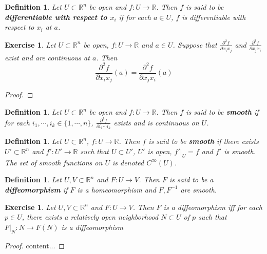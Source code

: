 \documentclass[12pt]{amsart}
\newtheorem{defn}[thm]{Definition}
\newtheorem{ex}[thm]{Exercise}
\newcommand{\R}{\mathbb{R}}
\begin{document}
	\begin{defn}
		Let $U \subset \R^n$ be open and $f: U \rightarrow \R$. Then $f$ is said to be \textbf{differentiable with respect to $x_i$} if for each $a \in U$, $f$ is differentiable with respect to $x_i$ at $a$.
	\end{defn}

	\begin{ex}
		Let $U \subset \R^n$ be open, $f: U \rightarrow \R$ and $a \in U$. Suppose that $\frac{\partial ^2 f}{\partial x_i x_j}$ and $\frac{\partial ^2 f}{\partial x_j x_i}$ exist and are continuous at $a$. Then $$\frac{\partial ^2 f}{\partial x_i x_j} (a) = \frac{\partial ^2 f}{\partial x_j x_i} (a)$$
	\end{ex}

	\begin{proof}
		
	\end{proof}

	\begin{defn}
		Let $U \subset \R^n$ be open and $f: U \rightarrow \R$. Then $f$ is said to be \textbf{smooth} if for each $i_1, \cdots, i_k \in \{1, \cdots, n\}$, $\frac{\partial^k f}{\partial i_1 \cdots i_k}$ exists and is continuous on $U$.
	\end{defn}

	\begin{defn}
		Let $U \subset \R^n$, $f: U \rightarrow \R$. Then $f$ is said to be \textbf{smooth} if there exists $U' 
		\subset \R^n$ and $f':U' \rightarrow \R$ such that $U \subset U'$, $U'$ is open, $f'|_U = f$ and $f'$ is smooth. The set of smooth functions on $U$ is denoted $C^{\infty}(U)$.
	\end{defn}

	\begin{defn}
		Let $U,V \subset \R^n$ and $F: U \rightarrow V$. Then $F$ is said to be a \textbf{diffeomorphism} if $F$ is a homeomorphism and $F, F^{-1}$ are smooth. 
	\end{defn}
	
	\begin{ex}
		Let $U,V \subset \R^n$ and $F: U \rightarrow V$. Then $F$ is a diffeomorphism iff for each $p \in U$, there exists a relatively open neighborhood $N \subset U$ of $p$ such that $F|_N:N \rightarrow F(N)$ is a diffeomorphism
	\end{ex}
	
	\begin{proof}
		content...
	\end{proof}
\end{document}
